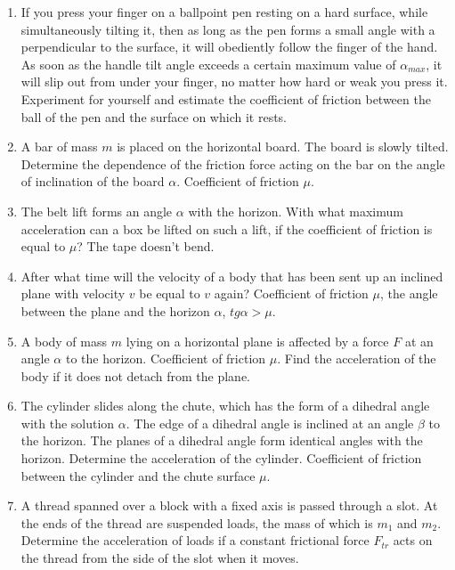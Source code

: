 \documentclass{article}
\begin{document}
\begin{enumerate}[label=2.1.\arabic*]
\item If you press your finger on a ballpoint pen resting on a hard surface, while simultaneously tilting it, then as long as the pen forms a small angle with a perpendicular to the surface, it will obediently follow the finger of the hand. As soon as the handle tilt angle exceeds a certain maximum value of $\alpha_{max}$, it will slip out from under your finger, no matter how hard or weak you press it. Experiment for yourself and estimate the coefficient of friction between the ball of the pen and the surface on which it rests.

\item A bar of mass $m$ is placed on the horizontal board. The board is slowly tilted. Determine the dependence of the friction force acting on the bar on the angle of inclination of the board $\alpha$. Coefficient of friction $\mu$.

\item The belt lift forms an angle $\alpha$ with the horizon. With what maximum acceleration can a box be lifted on such a lift, if the coefficient of friction is equal to $\mu$? The tape doesn't bend.

\item After what time will the velocity of a body that has been sent up an inclined plane with velocity $v$ be equal to $v$ again? Coefficient of friction $\mu$, the angle between the plane and the horizon $\alpha$, $tg \alpha > \mu$.

\item A body of mass $m$ lying on a horizontal plane is affected by a force $F$ at an angle $\alpha$ to the horizon. Coefficient of friction $\mu$. Find the acceleration of the body if it does not detach from the plane.

\item The cylinder slides along the chute, which has the form of a dihedral angle with the solution $\alpha$. The edge of a dihedral angle is inclined at an angle $\beta$ to the horizon. The planes of a dihedral angle form identical angles with the horizon. Determine the acceleration of the cylinder. Coefficient of friction between the cylinder and the chute surface $\mu$.

\item A thread spanned over a block with a fixed axis is passed through a slot. At the ends of the thread are suspended loads, the mass of which is $m_1$ and $m_2$. Determine the acceleration of loads if a constant frictional force $F_{tr}$ acts on the thread from the side of the slot when it moves.


\end{enumerate}
\end{document}
